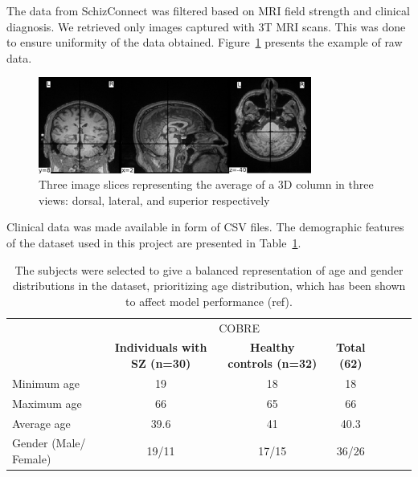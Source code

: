The data from SchizConnect was filtered based on MRI field strength and clinical diagnosis. We retrieved only images captured with 3T MRI scans. This was done to ensure uniformity of the data obtained. Figure~\ref{fig:raw_mri_volume_slices} presents the example of raw data.
\begin{figure}[h]
    \centering
    \includegraphics[width=0.8\textwidth]{./figs/sample_volume.png} %
    \caption{Three image slices representing the average of a 3D column in three views: dorsal, lateral, and superior respectively}\label{fig:raw_mri_volume_slices}
\end{figure}


Clinical data was made available in form of CSV files. The demographic features of the dataset used in this project are presented in Table~\ref{tab:cobre_clinical_demographic}.
\begin{center}
	\begin{table}
        \centering
        \caption{\label{tab:cobre_clinical_demographic}The subjects were selected to give a balanced representation of age and gender distributions in the dataset, prioritizing age distribution, which has been shown to affect model performance (ref).}
        \begin{tabular*}{500pt}{@{\extracolsep\fill}lcccccc@{\extracolsep\fill}}
            \toprule
            & \multicolumn{3}{c}{COBRE}
            \\\cmidrule{2-4}
            & \textbf{Individuals with SZ (n=30)} & \textbf{Healthy controls (n=32)} & \textbf{Total (62)} \\
            \midrule
            Minimum age             & 19  & 18  & 18 \\
            Maximum age 		    & 66  & 65 & 66  \\
            Average age             & 39.6 & 41 & 40.3	\\
            Gender (Male/ Female)   & 19/11 & 17/15 & 36/26	\\
            \bottomrule
        \end{tabular*}
    \end{table}    
\end{center}

